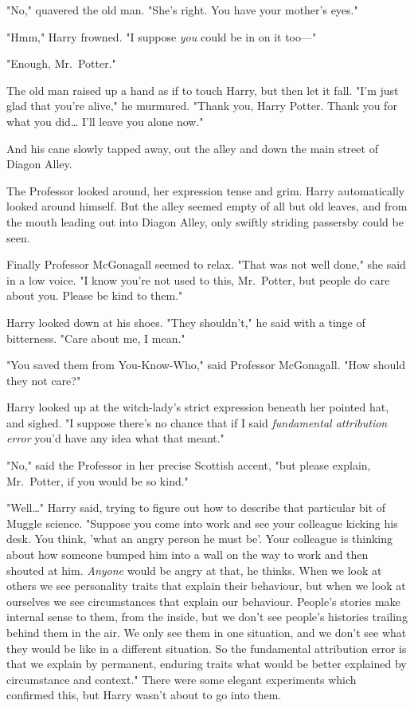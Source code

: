 "No," quavered the old man. "She's right. You have your mother's eyes."

"Hmm," Harry frowned. "I suppose \emph{you} could be in on it too---"

"Enough, Mr.~Potter."

The old man raised up a hand as if to touch Harry, but then let it fall. "I'm 
just glad that you're alive," he murmured. "Thank you, Harry Potter. Thank you 
for what you did{\ldots} I'll leave you alone now."

And his cane slowly tapped away, out the alley and down the main street of 
Diagon Alley.

The Professor looked around, her expression tense and grim. Harry automatically 
looked around himself. But the alley seemed empty of all but old leaves, and 
from the mouth leading out into Diagon Alley, only swiftly striding passersby 
could be seen.

Finally Professor McGonagall seemed to relax. "That was not well done," she 
said in a low voice. "I know you're not used to this, Mr.~Potter, but people do 
care about you. Please be kind to them."

Harry looked down at his shoes. "They shouldn't," he said with a tinge of 
bitterness. "Care about me, I mean."

"You saved them from You-Know-Who," said Professor McGonagall. "How should they 
not care?"

Harry looked up at the witch-lady's strict expression beneath her pointed hat, 
and sighed. "I suppose there's no chance that if I said \emph{fundamental 
attribution error} you'd have any idea what that meant."

"No," said the Professor in her precise Scottish accent, "but please explain, 
Mr.~Potter, if you would be so kind."

"Well{\ldots}" Harry said, trying to figure out how to describe that particular 
bit of Muggle science. "Suppose you come into work and see your colleague 
kicking his desk. You think, 'what an angry person he must be'. Your colleague 
is thinking about how someone bumped him into a wall on the way to work and 
then shouted at him. \emph{Anyone} would be angry at that, he thinks. When we 
look at others we see personality traits that explain their behaviour, but when 
we look at ourselves we see circumstances that explain our behaviour. People's 
stories make internal sense to them, from the inside, but we don't see people's 
histories trailing behind them in the air. We only see them in one situation, 
and we don't see what they would be like in a different situation. So the 
fundamental attribution error is that we explain by permanent, enduring traits 
what would be better explained by circumstance and context." There were some 
elegant experiments which confirmed this, but Harry wasn't about to go into 
them.

